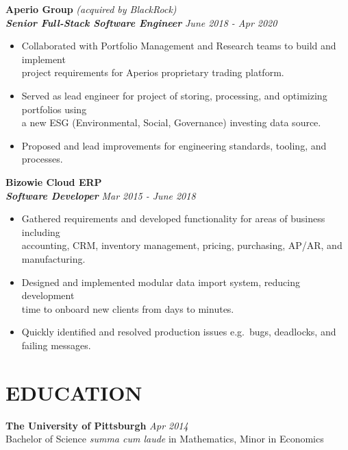 \documentclass[]{resume}
\newcommand\tab[1][.5cm]{\hspace*{#1}}
\begin{document}
\begin{resume}

\vspace{0.9mm}
\textbf{\large Aperio Group} {\textit{\large(acquired by BlackRock)}}\\
\tab \textbf{\textit{Senior Full-Stack Software Engineer}} \hfill \textit{June 2018 - Apr 2020}
\begin{itemize}
    \item
    Collaborated with Portfolio Management and Research teams to build and implement \\
    project requirements for Aperio\textsc{}s proprietary trading platform.
    \item
    Served as lead engineer for project of storing, processing, and optimizing portfolios using \\
    a new ESG (Environmental, Social, Governance) investing data source.
    \item
    Proposed and lead improvements for engineering standards, tooling, and processes.
\end{itemize}


\textbf{\large Bizowie Cloud ERP}\\
\tab\textbf{\textit{Software Developer}} \hfill \textit{Mar 2015 - June 2018}
\begin{itemize}
    \item
    Gathered requirements and developed functionality for areas of business including \\
    accounting, CRM, inventory management, pricing, purchasing, AP/AR, and manufacturing.
    \item
    Designed and implemented modular data import system, reducing development \\
    time to onboard new clients from days to minutes.
    \item 
    Quickly identified and resolved production issues e.g.\ bugs, deadlocks, and failing messages.
\end{itemize}


\section{EDUCATION\makebox[372 px]{\rule[.5 ex]{372 px}{1.0pt}}}
\vspace{0.9mm}
\textbf{\large The University of Pittsburgh} \hfill \textit{Apr 2014}\vspace{0.7mm}\\ 
\hspace*{4mm}Bachelor of Science \emph{summa cum laude} in Mathematics, Minor in Economics\\ %
\clearpage
\end{resume}
\end{document}
